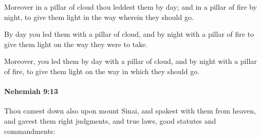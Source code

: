 			\begin{versebox}
					\item[BHS] 
					\item[LXX] 
					\item[ASV] Moreover in a pillar of cloud thou leddest them by day; and in a pillar of fire by night, to give them light in the way wherein they should go.
					\item[NIV] By day you led them with a pillar of cloud, and by night with a pillar of fire to give them light on the way they were to take.
					\item[NRSV] Moreover, you led them by day with a pillar of cloud, and by night with a pillar of fire, to give them light on the way in which they should go.
			\end{versebox}

		\paragraph{Nehemiah 9:13} %
			\label{NEHEMIAH-9-13}

			Thou camest down also upon mount Sinai, and spakest with them from heaven, and gavest them right judgments, and true laws, good statutes and commandments:

